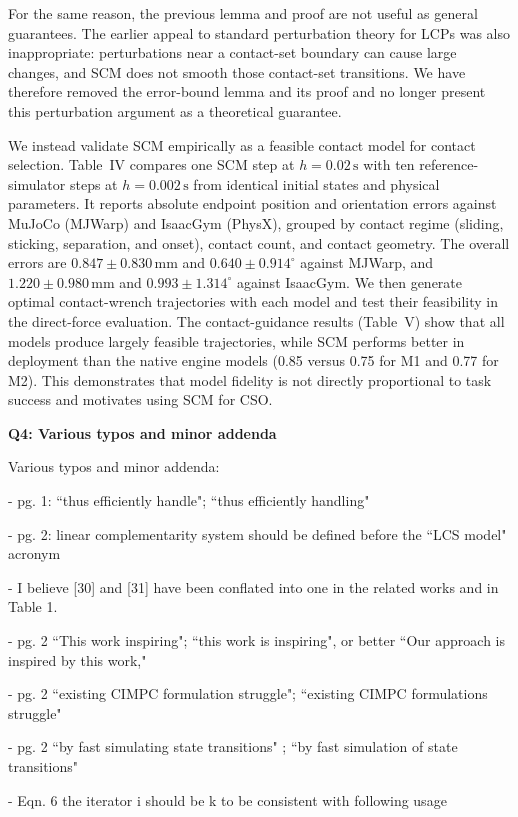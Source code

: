 \documentclass[journal,10pt]{IEEEtran}
\newcommand{\question}[2]{\par\smallskip\noindent
 \color{responseblue}\textbf{Q#1: #2}\par\nobreak\noindent\color{responseblue}}
\begin{document}
For the same reason, the previous lemma and proof are not useful as general guarantees. The earlier appeal to standard perturbation theory for LCPs was also inappropriate: perturbations near a contact-set boundary can cause large changes, and SCM does not smooth those contact-set transitions. We have therefore removed the error-bound lemma and its proof and no longer present this perturbation argument as a theoretical guarantee.

We instead validate SCM empirically as a feasible contact model for contact selection. Table~IV compares one SCM step at $h=0.02\,\mathrm{s}$ with ten reference-simulator steps at $h=0.002\,\mathrm{s}$ from identical initial states and physical parameters. It reports absolute endpoint position and orientation errors against MuJoCo (MJWarp) and IsaacGym (PhysX), grouped by contact regime (sliding, sticking, separation, and onset), contact count, and contact geometry. The overall errors are $0.847\pm0.830\,\mathrm{mm}$ and $0.640\pm0.914^{\circ}$ against MJWarp, and $1.220\pm0.980\,\mathrm{mm}$ and $0.993\pm1.314^{\circ}$ against IsaacGym. We then generate optimal contact-wrench trajectories with each model and test their feasibility in the direct-force evaluation. The contact-guidance results (Table~V) show that all models produce largely feasible trajectories, while SCM performs better in deployment than the native engine models (0.85 versus 0.75 for M1 and 0.77 for M2). This demonstrates that model fidelity is not directly proportional to task success and motivates using SCM for CSO.

\question{4}{Various typos and minor addenda}
Various typos and minor addenda:

- pg. 1: ``thus efficiently handle"; ``thus efficiently handling"

- pg. 2: linear complementarity system should be defined before the
``LCS model" acronym

- I believe [30] and [31] have been conflated into one in the related
works and in Table 1.

- pg. 2 ``This work inspiring"; ``this work is inspiring", or
better ``Our approach is inspired by this work,"

- pg. 2 ``existing CIMPC formulation struggle"; ``existing CIMPC
formulations struggle"

- pg. 2 ``by fast simulating state transitions" ; ``by fast
simulation of state transitions"

- Eqn. 6 the iterator i should be k to be consistent with following
usage
\end{document}
